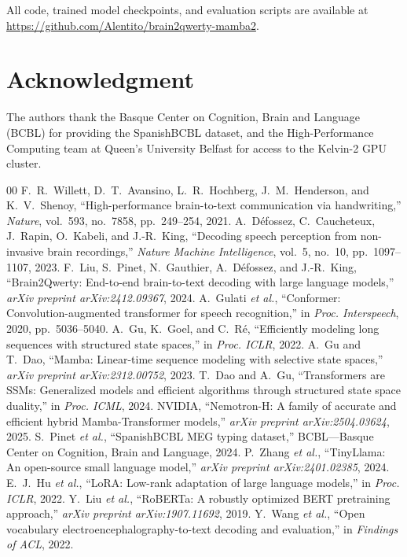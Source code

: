 \documentclass[conference]{IEEEtran}
\begin{document}
All code, trained model checkpoints, and evaluation scripts are available at \url{https://github.com/Alentito/brain2qwerty-mamba2}.

\section*{Acknowledgment}
The authors thank the Basque Center on Cognition, Brain and Language (BCBL) for providing the SpanishBCBL dataset, and the High-Performance Computing team at Queen's University Belfast for access to the Kelvin-2 GPU cluster.

\begin{thebibliography}{00}
 F.~R.~Willett, D.~T.~Avansino, L.~R.~Hochberg, J.~M.~Henderson, and K.~V.~Shenoy, ``High-performance brain-to-text communication via handwriting,'' \textit{Nature}, vol.~593, no.~7858, pp.~249--254, 2021.
 A.~D\'efossez, C.~Caucheteux, J.~Rapin, O.~Kabeli, and J.-R.~King, ``Decoding speech perception from non-invasive brain recordings,'' \textit{Nature Machine Intelligence}, vol.~5, no.~10, pp.~1097--1107, 2023.
 F.~Liu, S.~Pinet, N.~Gauthier, A.~D\'efossez, and J.-R.~King, ``Brain2Qwerty: End-to-end brain-to-text decoding with large language models,'' \textit{arXiv preprint arXiv:2412.09367}, 2024.
 A.~Gulati \textit{et al.}, ``Conformer: Convolution-augmented transformer for speech recognition,'' in \textit{Proc. Interspeech}, 2020, pp.~5036--5040.
 A.~Gu, K.~Goel, and C.~R\'e, ``Efficiently modeling long sequences with structured state spaces,'' in \textit{Proc. ICLR}, 2022.
 A.~Gu and T.~Dao, ``Mamba: Linear-time sequence modeling with selective state spaces,'' \textit{arXiv preprint arXiv:2312.00752}, 2023.
 T.~Dao and A.~Gu, ``Transformers are SSMs: Generalized models and efficient algorithms through structured state space duality,'' in \textit{Proc. ICML}, 2024.
 NVIDIA, ``Nemotron-H: A family of accurate and efficient hybrid Mamba-Transformer models,'' \textit{arXiv preprint arXiv:2504.03624}, 2025.
 S.~Pinet \textit{et al.}, ``SpanishBCBL MEG typing dataset,'' BCBL---Basque Center on Cognition, Brain and Language, 2024.
 P.~Zhang \textit{et al.}, ``TinyLlama: An open-source small language model,'' \textit{arXiv preprint arXiv:2401.02385}, 2024.
 E.~J.~Hu \textit{et al.}, ``LoRA: Low-rank adaptation of large language models,'' in \textit{Proc. ICLR}, 2022.
 Y.~Liu \textit{et al.}, ``RoBERTa: A robustly optimized BERT pretraining approach,'' \textit{arXiv preprint arXiv:1907.11692}, 2019.
 Y.~Wang \textit{et al.}, ``Open vocabulary electroencephalography-to-text decoding and evaluation,'' in \textit{Findings of ACL}, 2022.
\end{thebibliography}
\end{document}
